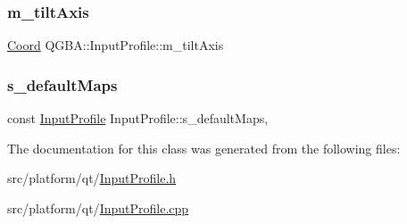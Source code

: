 \subsubsection{\texorpdfstring{m\+\_\+tilt\+Axis}{m\_tiltAxis}}
{\footnotesize\ttfamily \mbox{\hyperlink{class_q_g_b_a_1_1_input_profile_struct_q_g_b_a_1_1_input_profile_1_1_coord}{Coord}} Q\+G\+B\+A\+::\+Input\+Profile\+::m\+\_\+tilt\+Axis\hspace{0.3cm}{\ttfamily [private]}}

\mbox{\label{class_q_g_b_a_1_1_input_profile_af860057f592236db98588b4049cc3dff}} 
\subsubsection{\texorpdfstring{s\+\_\+default\+Maps}{s\_defaultMaps}}
{\footnotesize\ttfamily const \mbox{\hyperlink{class_q_g_b_a_1_1_input_profile}{Input\+Profile}} Input\+Profile\+::s\+\_\+default\+Maps\hspace{0.3cm}{\ttfamily [static]}, {\ttfamily [private]}}



The documentation for this class was generated from the following files\+:\begin{DoxyCompactItemize}
\item 
src/platform/qt/\mbox{\hyperlink{_input_profile_8h}{Input\+Profile.\+h}}\item 
src/platform/qt/\mbox{\hyperlink{_input_profile_8cpp}{Input\+Profile.\+cpp}}\end{DoxyCompactItemize}
